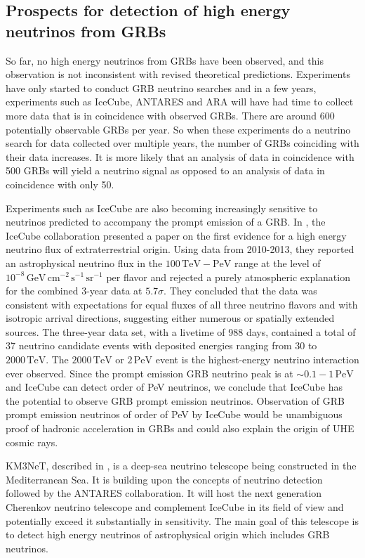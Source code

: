 \documentclass[12pt]{article}
\begin{document}
\begin{doublespace}
\begin{singlespace}
\section{Prospects for detection of high energy neutrinos from GRBs}
\end{singlespace}
So far, no high energy neutrinos from GRBs have been observed, and this observation is not inconsistent with revised theoretical predictions. Experiments have only started to conduct GRB neutrino searches and in a few years, experiments such as IceCube, ANTARES and ARA will have had time to collect more data that is in coincidence with observed GRBs. There are around 600 potentially observable GRBs per year. So when these experiments do a neutrino search for data collected over multiple years, the number of GRBs coinciding with their data increases. It is more likely that an analysis of data in coincidence with 500 GRBs will yield a neutrino signal as opposed to an analysis of data in coincidence with only 50. \par 
Experiments such as IceCube are also becoming increasingly sensitive to neutrinos predicted to accompany the prompt emission of a GRB. In \cite{IC2pev}, the IceCube collaboration presented a paper on the first evidence for a high energy neutrino flux of extraterrestrial origin. Using data from 2010-2013, they reported an astrophysical neutrino flux in the $100 \, \mathrm{TeV - PeV}$ range at the level of $10^{-8} \, \mathrm{GeV \, cm^{-2} \,  s^{-1} \,  sr^{-1}}$ per flavor and rejected a purely atmospheric explanation for the combined 3-year data at $5.7\sigma$. They concluded that the data was consistent with expectations for equal fluxes of all three neutrino flavors and with isotropic arrival directions, suggesting either numerous or spatially extended sources. The three-year data set, with a livetime of 988 days, contained a total of 37 neutrino candidate events with deposited energies ranging from 30 to $2000 \, \mathrm{TeV}$. The $2000 \, \mathrm{TeV}$ or $2 \, \mathrm{PeV}$ event is the highest-energy neutrino interaction ever observed. Since the prompt emission GRB neutrino peak is at $\sim 0.1-1 \, \mathrm{PeV}$ and IceCube can detect order of PeV neutrinos, we conclude that IceCube has the potential to observe GRB prompt emission neutrinos. Observation of GRB prompt emission neutrinos of order of PeV by IceCube would be unambiguous proof of hadronic acceleration in GRBs and could also explain the origin of UHE cosmic rays.  
 \par
KM3NeT, described in \cite{km3net}, is a deep-sea neutrino telescope being constructed in the Mediterranean Sea. It is building upon the concepts of neutrino detection followed by the ANTARES collaboration. It will host the next generation Cherenkov neutrino telescope and complement IceCube in its field of view and potentially exceed it substantially in sensitivity. The main goal of this telescope is to detect high energy neutrinos of astrophysical origin which includes GRB neutrinos.\par

\end{doublespace}
\end{document}
